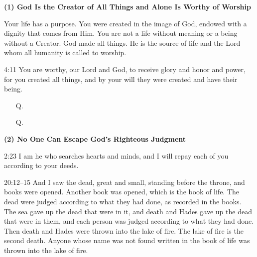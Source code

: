 \clearpage
{}

\begin{center}
\begin{tcolorbox}[
    width=0.95\textwidth,
    colback=white,
    colframe=gray!70,
    colbacktitle=gray,
    coltitle=white,
    title={\small Did you know that Revelation holds the gospel for you?},
    halign title=center,
    fontupper=\small\setstretch{1.0},
    enhanced,
    boxrule=0.5pt,
    breakable,
    left=6pt,
    right=6pt,
    top=6pt,
    bottom=6pt,
    before upper={\toggletrue{InOuterBox}},
]

\textbf{(1) God Is the Creator of All Things and Alone Is Worthy of Worship}

Your life has a purpose. You were created in the image of God, endowed with a dignity that comes from Him. You are not a life without meaning or a being without a Creator. God made all things. He is the source of life and the Lord whom all humanity is called to worship.

\begin{ScriptureBox}
\item[4:11] You are worthy, our Lord and God, to receive glory and honor and power, for you created all things, and by your will they were created and have their being.
\end{ScriptureBox}

\begin{itemize}[leftmargin=2em, labelsep=0.3em]
\item[Q.] 
\item[Q.] 
\end{itemize}

\vspace{0.3cm}

\textbf{(2) No One Can Escape God's Righteous Judgment}

\begin{ScriptureBox}
\item[2:23] I am he who searches hearts and minds, and I will repay each of you according to your deeds.
\item[20:12--15] And I saw the dead, great and small, standing before the throne, and books were opened. Another book was opened, which is the book of life. The dead were judged according to what they had done, as recorded in the books. The sea gave up the dead that were in it, and death and Hades gave up the dead that were in them, and each person was judged according to what they had done. Then death and Hades were thrown into the lake of fire. The lake of fire is the second death. Anyone whose name was not found written in the book of life was thrown into the lake of fire.
\end{ScriptureBox}


\end{tcolorbox}
\end{center}
